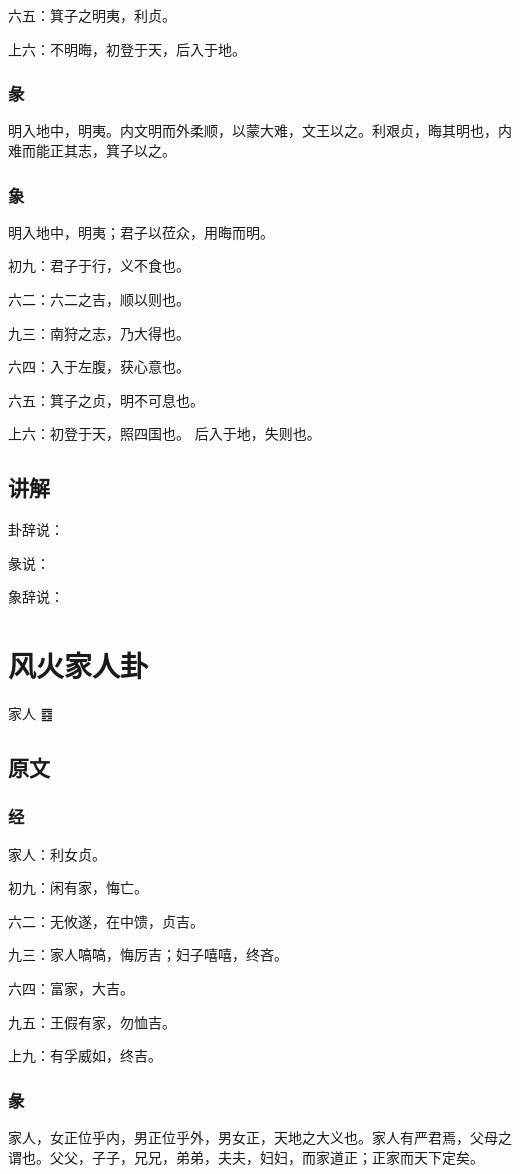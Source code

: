 \documentclass[12pt,oneside]{book}
\begin{document}
六五：箕子之明夷，利贞。

上六：不明晦，初登于天，后入于地。

\subsection{彖}
明入地中，明夷。内文明而外柔顺，以蒙大难，文王以之。利艰贞，晦其明也，内难而能正其志，箕子以之。

\subsection{象}
明入地中，明夷；君子以莅众，用晦而明。

初九：君子于行，义不食也。

六二：六二之吉，顺以则也。

九三：南狩之志，乃大得也。

六四：入于左腹，获心意也。

六五：箕子之贞，明不可息也。

上六：初登于天，照四国也。 后入于地，失则也。

\section{讲解}
卦辞说：

彖说：

象辞说：

\chapter{风火家人卦}
家人 {\Large ䷤}

\section{原文}

\subsection{经}
家人：利女贞。

初九：闲有家，悔亡。

六二：无攸遂，在中馈，贞吉。

九三：家人嗃嗃，悔厉吉；妇子嘻嘻，终吝。

六四：富家，大吉。

九五：王假有家，勿恤吉。

上九：有孚威如，终吉。

\subsection{彖}
家人，女正位乎内，男正位乎外，男女正，天地之大义也。家人有严君焉，父母之谓也。父父，子子，兄兄，弟弟，夫夫，妇妇，而家道正；正家而天下定矣。
\end{document}
